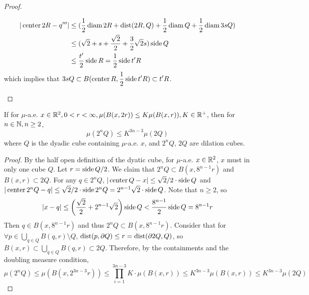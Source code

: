 \begin{proof}
\begin{enumerate}[(i)]
        \begin{equation*}
            \begin{split}
                |\operatorname{center} 2R - q^{\prime\prime\prime}| &\leq (\frac{1}{2}\operatorname{diam} 2R + \operatorname{dist}(2R, Q) + \frac{1}{2}\operatorname{diam} Q + \frac{1}{2}\operatorname{diam} 3sQ)\\
                &\leq (\sqrt{2}+s+\frac{\sqrt{2}}{2} + \frac{3}{2}\sqrt{2}s ) \operatorname{side} Q \\
                &\leq \frac{t^\prime}{2}\operatorname{side} R = \frac{1}{2}\operatorname{side} t^\prime R
            \end{split}
        \end{equation*}
        which implies that $\displaystyle 3sQ \subset B(\operatorname{center} R, \frac{1}{2}\operatorname{side} t^\prime R)\subset t^\prime R$.
    \end{enumerate}
\end{proof}


\begin{lemma}\label{lemma:doubling-meaure-4cubes}
    If for $\mu$-a.e. $x\in \mathbb{R}^2, 0<r<\infty, \mu(B(x, 2r))\leq K\mu(B(x,r)), K\in\mathbb{R}^+$, then for $n\in \mathbb{N}, n\geq 2$,
    \begin{equation}\label{eq:doubling4cubes}
        \mu(2^n Q)\leq K^{3n-3} \mu(2Q)
    \end{equation}
    where $Q$ is the dyadic cube containing $\mu$-a.e. $x$, and $2^n Q$, $2Q$ are dilation cubes.
\end{lemma}
\begin{proof}
    By the half open definition of the dyatic cube, for $\mu$-a.e. $x\in \mathbb{R}^2$, $x$ must in only one cube $Q$. Let $r = \operatorname{side} Q /2$. We claim that $2^n Q\subset B(x, 8^{n-1}r)$ and $B(x, r)\subset 2Q$. For any $q\in 2^n Q$, $|\operatorname{center} Q -x|\leq \sqrt{2}/2\cdot\operatorname{side} Q $ and $|\operatorname{center} 2^n Q -q|\leq \sqrt{2}/2 \cdot\operatorname{side} 2^n Q  = 2^{n-1}\sqrt{2}\cdot \operatorname{side} Q$. Note that $n\geq 2$, so
    \begin{equation*}
        |x-q| \leq \left(\frac{\sqrt{2}}{2} + 2^{n-1}\sqrt{2}\right) \operatorname{side} Q < \frac{8^{n-1}}{2} \operatorname{side} Q = 8^{n-1}r
    \end{equation*}
Then $q\in B(x, 8^{n-1}r)$ and thus $2^n Q\subset B(x, 8^{n-1}r)$. Consider that for $\forall p\in \bigcup_{q\in Q} B(q, r)\setminus Q$, $\operatorname{dist}(p, \partial Q)\leq r = \operatorname{dist}(\partial 2Q, Q)$, so $B(x, r)\subset \bigcup_{q\in Q} B(q, r)\subset 2Q$. Therefore, by the containments and the doubling measure condition, 
    \begin{equation*}
        \mu(2^n Q) \leq \mu(B(x, 2^{3n-3}r)) \leq \prod_{i=1}^{3n-3} K \cdot \mu(B(x,r))\leq K^{3n-3}\mu(B(x,r))\leq K^{3n-3}\mu(2Q)
    \end{equation*}
\end{proof}





